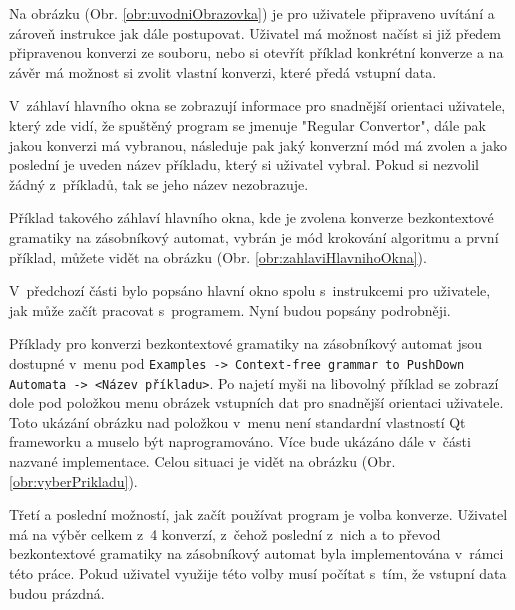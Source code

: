 
Na obrázku (Obr. \ref{obr:uvodniObrazovka}) je pro uživatele připraveno uvítání a zároveň instrukce jak dále postupovat. Uživatel má možnost načíst si již předem připravenou konverzi ze souboru, nebo si otevřít příklad konkrétní konverze a na závěr má možnost si zvolit vlastní konverzi, které předá vstupní data.



V~záhlaví hlavního okna se zobrazují informace pro snadnější orientaci uživatele, který zde vidí, že spuštěný program se jmenuje "Regular Convertor", dále pak jakou konverzi má vybranou, následuje pak jaký konverzní mód má zvolen a jako poslední je uveden název příkladu, který si uživatel vybral. Pokud si nezvolil žádný z~příkladů, tak se jeho název nezobrazuje.

Příklad takového záhlaví hlavního okna, kde je zvolena konverze bezkontextové gramatiky na zásobníkový automat, vybrán je mód krokování algoritmu a první příklad, můžete vidět na obrázku (Obr. \ref{obr:zahlaviHlavnihoOkna}).



V~předchozí části bylo popsáno hlavní okno spolu s~instrukcemi pro uživatele, jak může začít pracovat s~programem. Nyní budou popsány podrobněji.


Příklady pro konverzi bezkontextové gramatiky na zásobníkový automat jsou dostupné v~menu pod \texttt{Examples -> Context-free grammar to PushDown Automata -> <Název příkladu>}. Po najetí myši na libovolný příklad se zobrazí dole pod položkou menu obrázek vstupních dat pro snadnější orientaci uživatele. Toto ukázání obrázku nad položkou v~menu není standardní vlastností Qt frameworku a muselo být naprogramováno. Více bude ukázáno dále v~části nazvané implementace. Celou situaci je vidět na obrázku (Obr. \ref{obr:vyberPrikladu}).



Třetí a poslední možností, jak začít používat program je volba konverze. Uživatel má na výběr celkem z~4 konverzí, z~čehož poslední z~nich a to převod bezkontextové gramatiky na zásobníkový automat byla implementována v~rámci této práce. Pokud uživatel využije této volby musí počítat s~tím, že vstupní data budou prázdná.

